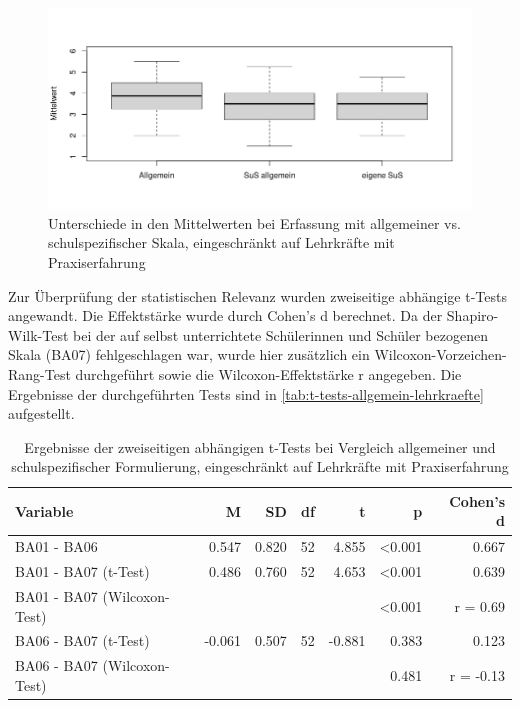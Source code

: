 \begin{figure}[h!]
	\includegraphics[width=\textwidth]{resources/boxplot-allgemein-lehrkraefte.png}
	\caption{Unterschiede in den Mittelwerten bei Erfassung mit allgemeiner vs. schulspezifischer Skala, eingeschränkt auf Lehrkräfte mit Praxiserfahrung}
	\label{fig:boxplot-allgemein-lehrkraefte}
\end{figure}

Zur Überprüfung der statistischen Relevanz wurden zweiseitige abhängige t-Tests angewandt.
Die Effektstärke wurde durch Cohen's d berechnet.
Da der Shapiro-Wilk-Test bei der auf selbst unterrichtete Schülerinnen und Schüler bezogenen Skala (BA07) fehlgeschlagen war, wurde hier zusätzlich ein Wilcoxon-Vorzeichen-Rang-Test durchgeführt sowie die Wilcoxon-Effektstärke r angegeben.
Die Ergebnisse der durchgeführten Tests sind in \autoref{tab:t-tests-allgemein-lehrkraefte} aufgestellt.

\begin{table}[h!]
	\begin{tabularx}{\textwidth}{X | r | r | r | r | r | r}
		\hline
		Variable & M & SD & df & t & p & Cohen's d\\
		\hline
		BA01 - BA06 & 0.547 & 0.820 & 52 & 4.855 & <0.001 & 0.667\\
		BA01 - BA07 (t-Test) & 0.486 & 0.760 & 52 & 4.653 & <0.001 & 0.639\\
		BA01 - BA07 (Wilcoxon-Test) & & & & & <0.001 & r = 0.69\\
		BA06 - BA07 (t-Test) & -0.061 & 0.507 & 52 & -0.881 & 0.383 & 0.123\\
		BA06 - BA07 (Wilcoxon-Test) & & & & & 0.481 & r = -0.13\\
		\hline
	\end{tabularx}
	\caption{Ergebnisse der zweiseitigen abhängigen t-Tests bei Vergleich allgemeiner und schulspezifischer Formulierung, eingeschränkt auf Lehrkräfte mit Praxiserfahrung}
	\label{tab:t-tests-allgemein-lehrkraefte}
\end{table}


